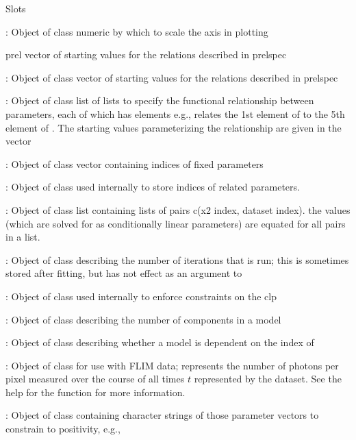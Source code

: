 \documentclass{article}
\begin{document}
\begin{Section}{Slots}
{\item[\code{scalx}:] Object of class   numeric by which to scale the  axis in plotting
\item[prel] vector of starting values for the relations described in 
prelspec
\item[\code{prel}:] Object of class   vector of starting values for the relations described in 
prelspec
\item[\code{prelspec}:] Object of class   list of lists to specify the functional
relationship between parameters, each of which has elements 
e.g., 
  relates the 1st element of  to the 5th element of 
.  The starting values parameterizing the relationship are 
given in the  vector
\item[\code{fvecind}:] Object of class   vector containing indices of fixed parameters 
\item[\code{pvecind}:] Object of class   used internally to
store indices of related parameters. 
\item[\code{groups}:] Object of class   list containing lists of pairs c(x2 index, dataset index). 
the  values (which are solved for as conditionally linear 
parameters) are equated for all pairs in a list.
\item[\code{iter}:] Object of class   describing the 
number of iterations that is run; this is sometimes 
stored after fitting, but has not effect as an argument to  
\item[\code{clpCon}:] Object of class   used internally to enforce constraints on the clp
\item[\code{ncomp}:] Object of class   describing the number of components in a model
\item[\code{clpdep}:] Object of class   describing whether a model is dependent on the index
of 
\item[\code{inten}:] Object of class   for use with FLIM data; represents the number of photons
per pixel measured over the course of all 
times $t$ represented by the dataset.  See the help for the 
function for more information. 
\item[\code{positivepar}:] Object of class   containing
character strings of those parameter vectors to constrain to positivity,
e.g., 
}
\end{Section}
\end{document}
